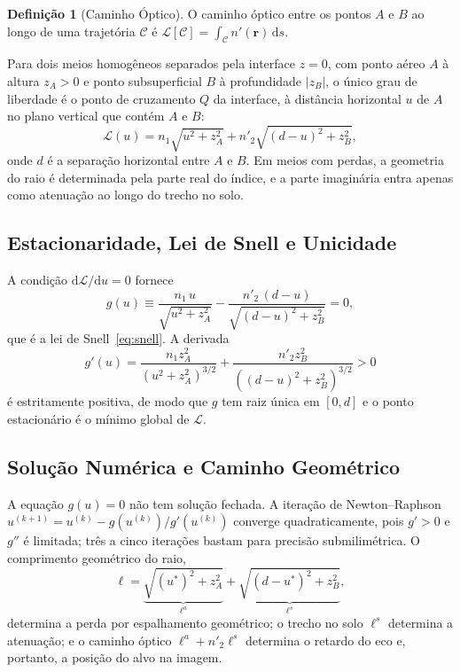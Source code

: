 \documentclass[12pt,a4paper,oneside]{book}
\theoremstyle{remark}
\newcommand{\vect}[1]{\boldsymbol{#1}}
\newcommand{\dd}{\mathrm{d}}
\theoremstyle{plain}
\theoremstyle{definition}
\newtheorem{definicaom}{Definição}[chapter]
\begin{document}
\begin{definicaom}[Caminho Óptico]
\label{def:caminho_optico}
O caminho óptico entre os pontos $A$ e $B$ ao longo de uma trajetória
$\mathcal{C}$ é $\mathcal{L}[\mathcal{C}] = \int_{\mathcal{C}} n'(\vect{r})\,\dd s$.
\end{definicaom}

Para dois meios homogêneos separados pela interface $z=0$, com ponto aéreo
$A$ à altura $z_A>0$ e ponto subsuperficial $B$ à profundidade $|z_B|$, o único
grau de liberdade é o ponto de cruzamento $Q$ da interface, à distância
horizontal $u$ de $A$ no plano vertical que contém $A$ e $B$:
\begin{equation}
  \mathcal{L}(u) = n_1\sqrt{u^2 + z_A^2} + n'_2\sqrt{(d-u)^2 + z_B^2},
  \label{eq:fermat_L}
\end{equation}
onde $d$ é a separação horizontal entre $A$ e $B$. Em meios com perdas, a
geometria do raio é determinada pela parte real do índice, e a parte imaginária
entra apenas como atenuação ao longo do trecho no solo.

\subsection{Estacionaridade, Lei de Snell e Unicidade}
\label{ssec:fermat_snell}

A condição $\dd\mathcal{L}/\dd u = 0$ fornece
\begin{equation}
  g(u) \equiv \frac{n_1\,u}{\sqrt{u^2+z_A^2}} - \frac{n'_2\,(d-u)}{\sqrt{(d-u)^2+z_B^2}} = 0,
  \label{eq:fermat_estac}
\end{equation}
que é a lei de Snell~\eqref{eq:snell}. A derivada
\begin{equation}
  g'(u) = \frac{n_1 z_A^2}{(u^2+z_A^2)^{3/2}}
  + \frac{n'_2 z_B^2}{((d-u)^2+z_B^2)^{3/2}} > 0
  \label{eq:g_prime}
\end{equation}
é estritamente positiva, de modo que $g$ tem raiz única em $[0,d]$ e o ponto
estacionário é o mínimo global de $\mathcal{L}$.

\subsection{Solução Numérica e Caminho Geométrico}
\label{ssec:newton}

A equação $g(u)=0$ não tem solução fechada. A iteração de Newton--Raphson
$u^{(k+1)} = u^{(k)} - g(u^{(k)})/g'(u^{(k)})$ converge quadraticamente, pois
$g'>0$ e $g''$ é limitada; três a cinco iterações bastam para precisão
submilimétrica. O comprimento geométrico do raio,
\begin{equation}
  \ell = \underbrace{\sqrt{(u^*)^2+z_A^2}}_{\ell^{a}} + \underbrace{\sqrt{(d-u^*)^2+z_B^2}}_{\ell^{s}},
  \label{eq:path_geom}
\end{equation}
determina a perda por espalhamento geométrico; o trecho no solo $\ell^{s}$
determina a atenuação; e o caminho óptico $\ell^{a}+n'_2\ell^{s}$ determina o
retardo do eco e, portanto, a posição do alvo na imagem.
\end{document}
